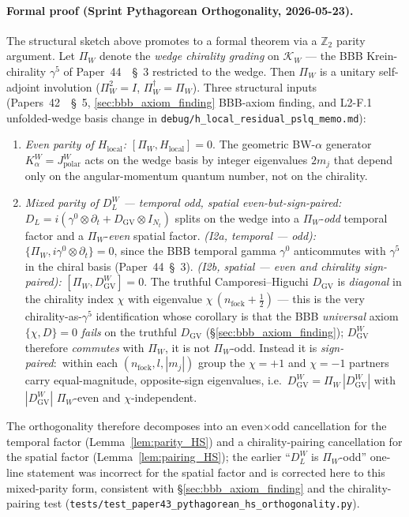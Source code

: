 \documentclass[11pt,a4paper]{article}
\theoremstyle{plain}
\theoremstyle{definition}
\newcommand{\Nt}{N_t}
\newcommand{\DGV}{D_{\mathrm{GV}}}
\newcommand{\DL}{D_{L}}
\begin{document}
\paragraph{Formal proof (Sprint Pythagorean Orthogonality, 2026-05-23).}
The structural sketch above promotes to a formal theorem via a
$\mathbb{Z}_{2}$ parity argument. Let $\Pi_{W}$ denote the
\emph{wedge chirality grading} on $\mathcal{K}_{W}$ — the BBB
Krein-chirality $\gamma^{5}$ of Paper~44~\cite{paper44}~\S~3
restricted to the wedge. Then $\Pi_{W}$ is a unitary self-adjoint
involution ($\Pi_{W}^{2} = I$, $\Pi_{W}^{\dagger} = \Pi_{W}$).
Three structural inputs (Papers~42~\cite{paper42}~\S~5,
\ref{sec:bbb_axiom_finding} BBB-axiom finding, and L2-F.1
unfolded-wedge basis change in
\texttt{debug/h\_local\_residual\_pslq\_memo.md}):

\begin{enumerate}
\item[(I1)] \emph{Even parity of $H_{\mathrm{local}}$:}
$[\Pi_{W}, H_{\mathrm{local}}] = 0$. The geometric BW-$\alpha$
generator $K_{\alpha}^{W} = J_{\mathrm{polar}}^{W}$ acts on the
wedge basis by integer eigenvalues $2 m_{j}$ that depend only on
the angular-momentum quantum number, not on the chirality.

\item[(I2)] \emph{Mixed parity of $\DL^{W}$ --- temporal odd, spatial
even-but-sign-paired:}
$\DL = i(\gamma^{0} \otimes \partial_{t} + \DGV \otimes I_{\Nt})$
splits on the wedge into a $\Pi_{W}$-\emph{odd} temporal factor and a
$\Pi_{W}$-\emph{even} spatial factor.
\emph{(I2a, temporal --- odd):}
$\{\Pi_{W}, i\gamma^{0} \otimes \partial_{t}\} = 0$, since the BBB temporal
gamma $\gamma^{0}$ anticommutes with $\gamma^{5}$ in the chiral basis
(Paper~44~\S~3).
\emph{(I2b, spatial --- even and chirality sign-paired):}
$[\Pi_{W}, \DGV^{W}] = 0$. The truthful Camporesi--Higuchi $\DGV$ is
\emph{diagonal} in the chirality index $\chi$ with eigenvalue
$\chi\,(n_{\mathrm{fock}} + \tfrac{1}{2})$ --- this is the very
chirality-as-$\gamma^{5}$ identification whose corollary is that the BBB
\emph{universal} axiom $\{\chi, D\} = 0$ \emph{fails} on the truthful
$\DGV$ (\S\ref{sec:bbb_axiom_finding}); $\DGV^{W}$ therefore
\emph{commutes} with $\Pi_{W}$, it is not $\Pi_{W}$-odd. Instead it is
\emph{sign-paired}:\ within each $(n_{\mathrm{fock}}, l, |m_{j}|)$ group
the $\chi = +1$ and $\chi = -1$ partners carry equal-magnitude,
opposite-sign eigenvalues, i.e.\ $\DGV^{W} = \Pi_{W}\,|\DGV^{W}|$ with
$|\DGV^{W}|$ $\Pi_{W}$-even and $\chi$-independent.
\end{enumerate}
The orthogonality therefore decomposes into an even$\times$odd
cancellation for the temporal factor (Lemma~\ref{lem:parity_HS}) and a
chirality-pairing cancellation for the spatial factor
(Lemma~\ref{lem:pairing_HS}); the earlier ``$\DL^{W}$ is $\Pi_{W}$-odd''
one-line statement was incorrect for the spatial factor and is corrected
here to this mixed-parity form, consistent with
\S\ref{sec:bbb_axiom_finding} and the
chirality-pairing test (\texttt{tests/test\_paper43\_pythagorean\_hs\_orthogonality.py}).
\end{document}
